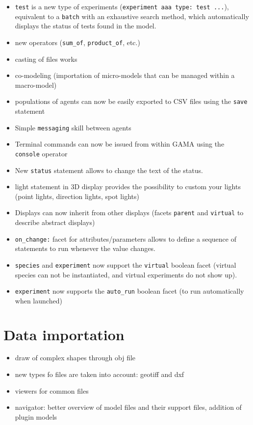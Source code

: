 \documentclass[]{book}
\providecommand{\tightlist}{%
  \setlength{\itemsep}{0pt}\setlength{\parskip}{0pt}}
\theoremstyle{definition}
\theoremstyle{definition}
\theoremstyle{definition}
\theoremstyle{remark}
\begin{document}
\begin{itemize}
\item
  \texttt{test} is a new type of experiments
  (\texttt{experiment\ aaa\ type:\ test\ ...}), equivalent to a
  \texttt{batch} with an exhaustive search method, which automatically
  displays the status of tests found in the model.
\item
  new operators (\texttt{sum\_of}, \texttt{product\_of}, etc.)
\item
  casting of files works
\item
  co-modeling (importation of micro-models that can be managed within a
  macro-model)
\item
  populations of agents can now be easily exported to CSV files using
  the \texttt{save} statement
\item
  Simple \texttt{messaging} skill between agents\\
\item
  Terminal commands can now be issued from within GAMA using the
  \texttt{console} operator
\item
  New \texttt{status} statement allows to change the text of the status.
\item
  light statement in 3D display provides the possibility to custom your
  lights (point lights, direction lights, spot lights)
\item
  Displays can now inherit from other displays (facets \texttt{parent}
  and \texttt{virtual} to describe abstract displays)
\item
  \texttt{on\_change:} facet for attributes/parameters allows to define
  a sequence of statements to run whenever the value changes.
\item
  \texttt{species} and \texttt{experiment} now support the
  \texttt{virtual} boolean facet (virtual species can not be
  instantiated, and virtual experiments do not show up).
\item
  \texttt{experiment} now supports the \texttt{auto\_run} boolean facet
  (to run automatically when launched)
\end{itemize}

\section{Data importation}\label{data-importation}

\begin{itemize}
\tightlist
\item
  draw of complex shapes through obj file
\item
  new types fo files are taken into account: geotiff and dxf
\item
  viewers for common files
\item
  navigator: better overview of model files and their support files,
  addition of plugin models
\end{itemize}
\end{document}
